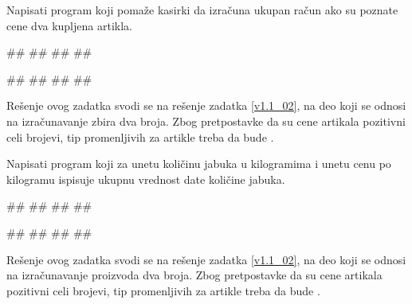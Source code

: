 \begin{Exercise}[label=p1_005]
Napisati program koji pomaže kasirki da izračuna ukupan račun ako su poznate cene dva kupljena artikla. 

\begin{miditest}
\begin{upotreba}{1}
#\naslovInt#
##
##
##
\end{upotreba}
\end{miditest}
\begin{miditest}
\begin{upotreba}{2}
#\naslovInt#
##
##
##
\end{upotreba}
\end{miditest}

\end{Exercise}
\ifresenja
\begin{Answer}[ref=p1_005]

Rešenje ovog zadatka svodi se na rešenje zadatka \ref{v1.1_02}, na deo koji se odnosi na izračunavanje zbira dva broja. Zbog pretpostavke da su cene artikala pozitivni celi brojevi, tip promenljivih za artikle treba da bude .
\end{Answer}
\fi

\begin{Exercise}[label=p1_05]
Napisati program koji za unetu količinu jabuka u kilogramima i unetu
cenu po kilogramu ispisuje ukupnu vrednost date količine jabuka.  

\begin{miditest}
\begin{upotreba}{1}
#\naslovInt#
##
##
##
\end{upotreba}
\end{miditest}
\begin{miditest}
\begin{upotreba}{1}
#\naslovInt#
##
##
##
\end{upotreba}
\end{miditest}
\end{Exercise}
\ifresenja
\begin{Answer}[ref=p1_05]

Rešenje ovog zadatka svodi se na rešenje zadatka \ref{v1.1_02}, na deo koji se odnosi na izračunavanje proizvoda dva broja. Zbog pretpostavke da su cene artikala pozitivni celi brojevi, tip promenljivih za artikle treba da bude .
\end{Answer}
\fi


